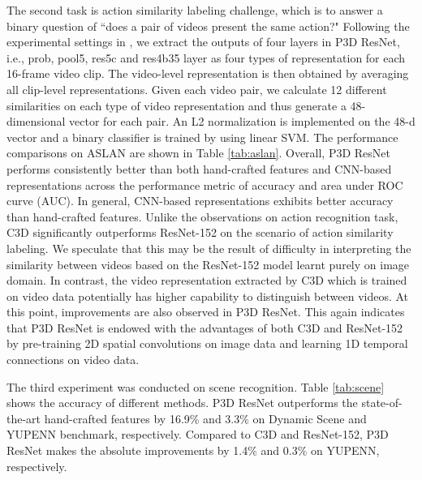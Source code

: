 \documentclass[10pt,twocolumn,letterpaper]{article}
\begin{document}
The second task is action similarity labeling challenge, which is to answer a binary question of ``does a pair of videos present the same action?" Following the experimental settings in \cite{KG:PAMI12,tran2015learning}, we extract the outputs of four layers in P3D ResNet, i.e., prob, pool5, res5c and res4b35 layer as four types of representation for each 16-frame video clip. The video-level representation is then obtained by averaging all clip-level representations. Given each video pair, we calculate 12 different similarities on each type of video representation and thus generate a 48-dimensional vector for each pair. An L2 normalization is implemented on the 48-d vector and a binary classifier is trained by using linear SVM. The performance comparisons on ASLAN are shown in Table \ref{tab:aslan}. Overall, P3D ResNet performs consistently better than both hand-crafted features and CNN-based representations across the performance metric of accuracy and area under ROC curve (AUC). In general, CNN-based representations exhibits better accuracy than hand-crafted features. Unlike the observations on action recognition task, C3D significantly outperforms ResNet-152 on the scenario of action similarity labeling. We speculate that this may be the result of difficulty in interpreting the similarity between videos based on the ResNet-152 model learnt purely on image domain. In contrast, the video representation extracted by C3D which is trained on video data potentially has higher capability to distinguish between videos. At this point, improvements are also observed in P3D ResNet. This again indicates that P3D ResNet is endowed with the advantages of both C3D and ResNet-152 by pre-training 2D spatial convolutions on image data and learning 1D temporal connections on video data.

The third experiment was conducted on scene recognition. Table \ref{tab:scene} shows the accuracy of different methods. P3D ResNet outperforms the state-of-the-art hand-crafted features \cite{feichtenhofer2014bags} by 16.9\% and 3.3\% on Dynamic Scene and YUPENN benchmark, respectively. Compared to C3D and ResNet-152, P3D ResNet makes the absolute improvements by 1.4\% and 0.3\% on YUPENN, respectively.
\end{document}
